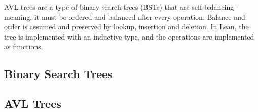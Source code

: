 AVL trees are a type of binary search trees (BSTs) that are self-balancing - meaning, it must be ordered and balanced after every operation. Balance and order is assumed and preserved by lookup, insertion and deletion. In Lean, the tree is implemented with an inductive type, and the operations are implemented as functions.

\subsection{Binary Search Trees}
\label{sec:bst}


\subsection{AVL Trees}

